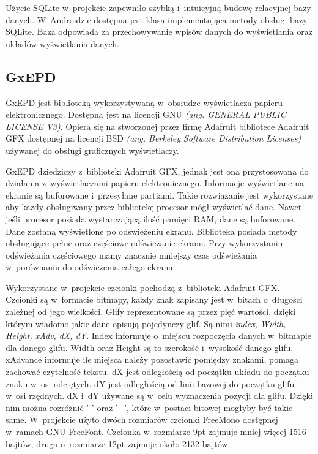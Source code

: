 \documentclass[a4paper,12pt, twoside]{article}
\begin{document}
    	Użycie SQLite w~projekcie zapewniło szybką i~intuicyjną budowę relacyjnej bazy danych. W~Androidzie dostępna jest klasa implementująca metody obsługi bazy SQLite. Baza odpowiada za przechowywanie wpisów danych do wyświetlania oraz układów wyświetlania danych. 
    	
    	\subsection{GxEPD}\label{GxEPD}
    	GxEPD jest biblioteką wykorzystywaną w~obsłudze wyświetlacza papieru elektronicznego. Dostępna jest na licencji GNU \textit{(ang. GENERAL PUBLIC LICENSE V3)}. Opiera się na stworzonej przez firmę Adafruit bibliotece Adafruit GFX dostępnej na licencji BSD \textit{(ang. Berkeley Software Distribution Licenses)} używanej do obsługi graficznych wyświetlaczy.
    	
    	GxEPD dziedziczy z~biblioteki Adafruit GFX, jednak jest ona przystosowana do działania z~wyświetlaczami papieru elektronicznego. Informacje wyświetlane na ekranie są buforowane i~przesyłane partiami. Takie rozwiązanie jest wykorzystane aby każdy obsługiwany przez bibliotekę procesor mógł wyświetlać dane. Nawet jeśli procesor posiada wystarczającą ilość pamięci RAM, dane są buforowane. Dane zostaną wyświetlone po odświeżeniu ekranu. Biblioteka posiada metody obsługujące pełne oraz częściowe odświeżanie ekranu. Przy wykorzystaniu odświeżania częściowego mamy znacznie mniejszy czas odświeżania w~porównaniu do odświeżenia całego ekranu.
    	
        Wykorzystane w~projekcie czcionki pochodzą z~biblioteki Adafruit GFX. Czcionki są w~formacie bitmapy, każdy znak zapisany jest w~bitach o~długości zależnej od jego wielkości. Glify reprezentowane są przez pięć wartości, dzięki którym wiadomo jakie dane opisują pojedynczy glif. Są nimi \textit{index,  Width, Height, xAdv, dX, dY}. Index informuje o~miejscu rozpoczęcia danych w~bitmapie dla danego glifu. Width oraz Height są to szerokość i~wysokość danego glifu. xAdvance informuje ile miejsca należy pozostawić pomiędzy znakami, pomaga zachować czytelność tekstu. dX jest odległością od początku układu do początku znaku w~osi odciętych. dY jest odległością od linii bazowej do początku glifu w~osi rzędnych. dX i~dY używane są w~celu wyznaczenia pozycji dla glifu. Dzięki nim można rozróżnić '-' oraz '\_', które w~postaci bitowej mogłyby być takie same. W~projekcie użyto dwóch rozmiarów czcionki FreeMono dostępnej w~ramach GNU FreeFont. Czcionka w~rozmiarze 9pt zajmuje mniej więcej 1516 bajtów, druga o~rozmiarze 12pt zajmuje około 2132 bajtów.
        
\end{document}
